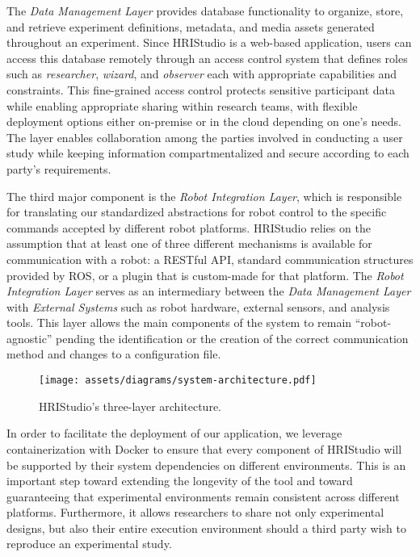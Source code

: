 \documentclass[letterpaper, 10 pt, conference]{subfiles/ieeeconf}
\begin{document}
The \emph{Data Management Layer} provides database functionality to organize, store, and retrieve experiment definitions, metadata, and media assets generated throughout an experiment. Since HRIStudio is a web-based application, users can access this database remotely through an access control system that defines roles such as \emph{researcher}, \emph{wizard}, and \emph{observer} each with appropriate capabilities and constraints. This fine-grained access control protects sensitive participant data while enabling appropriate sharing within research teams, with flexible deployment options either on-premise or in the cloud depending on one's needs. The layer enables collaboration among the parties involved in conducting a user study while keeping information compartmentalized and secure according to each party's requirements.

The third major component is the \emph{Robot Integration Layer}, which is responsible for translating our standardized abstractions for robot control to the specific commands accepted by different robot platforms. HRIStudio relies on the assumption that at least one of three different mechanisms is available for communication with a robot: a {RESTful API}, standard communication structures provided by ROS, or a plugin that is custom-made for that platform. The \emph{Robot Integration Layer} serves as an intermediary between the \emph{Data Management Layer} with \emph{External Systems} such as robot hardware, external sensors, and analysis tools. This layer allows the main components of the system to remain ``robot-agnostic'' pending the identification or the creation of the correct communication method and changes to a configuration file.

\begin{figure}[ht]
    \centering
    \texttt{[image: assets/diagrams/system-architecture.pdf]}
    \caption{HRIStudio's three-layer architecture.}
    \label{fig:system-architecture}
\end{figure}

In order to facilitate the deployment of our application, we leverage containerization with Docker to ensure that every component of HRIStudio will be supported by their system dependencies on different environments. This is an important step toward extending the longevity of the tool and toward guaranteeing that experimental environments remain consistent across different platforms. Furthermore, it allows researchers to share not only experimental designs, but also their entire execution environment should a third party wish to reproduce an experimental study.
\end{document}
